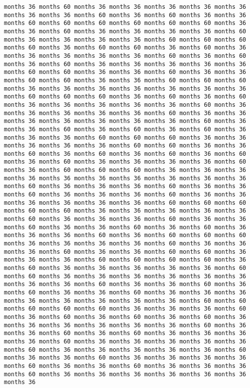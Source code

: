 \documentclass[11pt]{article}
\begin{document}
\begin{Verbatim}[commandchars=\\\{\}, frame=single, framerule=2mm, rulecolor=\color{outerrorbackground}]
months 36 months 60 months 36 months 36 months 36 months 36 months 36 months 36 months 36 months 60 months 36 months 60 months 36 months 36 months 60 months 60 months 60 months 60 months 60 months 60 months 36 months 36 months 60 months 36 months 36 months 36 months 36 months 60 months 36 months 36 months 36 months 36 months 60 months 60 months 60 months 60 months 36 months 60 months 60 months 36 months 60 months 36 months 36 months 36 months 36 months 36 months 60 months 36 months 60 months 36 months 60 months 36 months 36 months 36 months 36 months 36 months 60 months 60 months 36 months 36 months 60 months 36 months 36 months 60 months 60 months 36 months 36 months 60 months 60 months 60 months 36 months 36 months 36 months 36 months 36 months 36 months 36 months 60 months 60 months 60 months 36 months 60 months 36 months 60 months 36 months 36 months 36 months 36 months 36 months 60 months 36 months 36 months 36 months 36 months 36 months 60 months 36 months 36 months 36 months 36 months 36 months 36 months 36 months 60 months 36 months 36 months 60 months 36 months 60 months 36 months 60 months 36 months 36 months 36 months 60 months 60 months 60 months 36 months 36 months 36 months 36 months 36 months 60 months 60 months 36 months 36 months 60 months 36 months 60 months 36 months 60 months 36 months 60 months 36 months 60 months 36 months 36 months 36 months 36 months 60 months 36 months 60 months 60 months 60 months 36 months 36 months 36 months 36 months 36 months 36 months 36 months 36 months 36 months 36 months 60 months 36 months 36 months 36 months 60 months 36 months 36 months 60 months 36 months 36 months 36 months 60 months 36 months 36 months 36 months 36 months 36 months 36 months 60 months 60 months 60 months 60 months 60 months 36 months 36 months 36 months 36 months 36 months 60 months 36 months 36 months 36 months 60 months 36 months 36 months 60 months 36 months 36 months 60 months 36 months 60 months 36 months 36 months 36 months 60 months 36 months 60 months 60 months 60 months 36 months 36 months 36 months 36 months 60 months 36 months 36 months 36 months 60 months 36 months 36 months 60 months 60 months 36 months 36 months 36 months 60 months 60 months 60 months 60 months 36 months 60 months 36 months 36 months 36 months 36 months 36 months 60 months 60 months 36 months 36 months 36 months 36 months 36 months 36 months 36 months 36 months 60 months 36 months 36 months 60 months 36 months 60 months 36 months 36 months 60 months 36 months 36 months 36 months 36 months 36 months 36 months 36 months 36 months 60 months 60 months 60 months 60 months 60 months 36 months 36 months 36 months 60 months 36 months 60 months 36 months 60 months 36 months 60 months 36 months 36 months 36 months 36 months 36 months 36 months 60 months 36 months 36 months 60 months 36 months 60 months 36 months 36 months 36 months 36 months 60 months 36 months 36 months 36 months 36 months 36 months 60 months 36 months 36 months 36 months 36 months 36 months 60 months 36 months 36 months 60 months 36 months 36 months 36 months 36 months 60 months 36 months 36 months 60 months 36 months 36 months 36 months 60 months 36 months 36 months 36 months 36 months 36 months 36 months 36 
\end{Verbatim}
\end{document}
